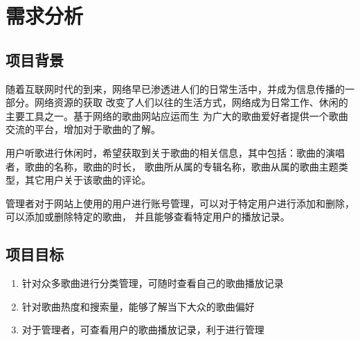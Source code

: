 \documentclass[UTF8,14pt]{article}
\numberwithin{figure}{subsubsection}
\numberwithin{table}{subsubsection}
\begin{document}
\section{需求分析}
\subsection{项目背景}
随着互联网时代的到来，网络早已渗透进人们的日常生活中，并成为信息传播的一部分。网络资源的获取
改变了人们以往的生活方式，网络成为日常工作、休闲的主要工具之一。基于网络的歌曲网站应运而生
为广大的歌曲爱好者提供一个歌曲交流的平台，增加对于歌曲的了解。

用户听歌进行休闲时，希望获取到关于歌曲的相关信息，其中包括：歌曲的演唱者，歌曲的名称，歌曲的时长，
歌曲所从属的专辑名称，歌曲从属的歌曲主题类型，其它用户关于该歌曲的评论。

管理者对于网站上使用的用户进行账号管理，可以对于特定用户进行添加和删除，可以添加或删除特定的歌曲，
并且能够查看特定用户的播放记录。
\subsection{项目目标}
\begin{enumerate}
	\setlength{\itemsep}{0pt}
	      \setlength{\parsep}{0pt}
	      \setlength{\parskip}{0pt}
	\item 针对众多歌曲进行分类管理，可随时查看自己的歌曲播放记录
	\item 针对歌曲热度和搜索量，能够了解当下大众的歌曲偏好
	\item 对于管理者，可查看用户的歌曲播放记录，利于进行管理
\end{enumerate}
\end{document}
